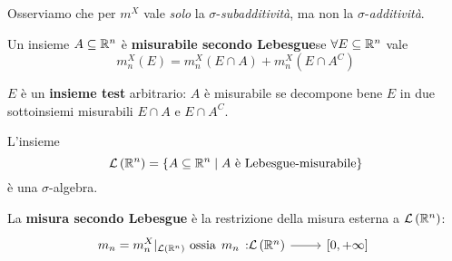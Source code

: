 	Osserviamo che per $m^X$ vale \textit{solo} la  $\sigma$-\textit{subadditività}, ma non la $\sigma$-\textit{additività}.
	\begin{define}
		Un insieme $A\subseteq\mathbb{R}^n$ è \textbf{misurabile secondo Lebesgue}se $\forall E\subseteq\mathbb{R}^n$ vale
		\begin{equation}
			m_n^X\left(E\right)=m_n^X\left(E\cap A\right)+m_n^X\left(E\cap A^C\right)
		\end{equation}
	\end{define}
	$E$ è un \textbf{insieme test} arbitrario: $A$ è misurabile se decompone bene $E$ in due sottoinsiemi misurabili $E\cap A$ e $E\cap A^C$.
	\begin{propositionqed}
		L'insieme
		\begin{equation*}
			\mathcal{L}\left(\mathbb{R}^n\right)=\left\{A\subseteq \mathbb{R}^n\mid A\text{ è Lebesgue-misurabile}\right\}
		\end{equation*}
		è una $\sigma$-algebra.
	\end{propositionqed}
	\begin{define}
		La \textbf{misura secondo Lebesgue} è la restrizione della misura esterna a $\mathcal{L}\left(\mathbb{R}^n\right)$:
		\begin{equation}
			m_n={m^X_n}\vert_{ \mathcal{L}\left(\realset^n\right)}\text{ ossia}\funz{m_n}{\mathcal{L}\left(\realset^n\right)}{\left[0,+\infty\right]}
		\end{equation}
	\end{define}
